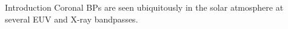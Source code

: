 \documentclass[t]{beamer}
\begin{document}
\begin{block}{Introduction}
    Coronal BPs are seen ubiquitously in the solar atmosphere at several
    EUV and X-ray bandpasses.
\end{block}
\end{document}
